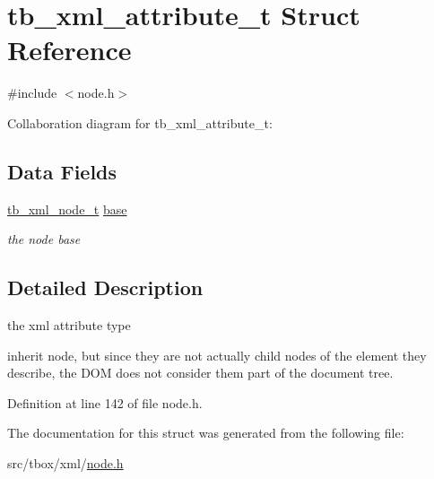 \hypertarget{structtb__xml__attribute__t}{\section{tb\-\_\-xml\-\_\-attribute\-\_\-t Struct Reference}
\label{structtb__xml__attribute__t}
}


{\ttfamily \#include $<$node.\-h$>$}



Collaboration diagram for tb\-\_\-xml\-\_\-attribute\-\_\-t\-:
\subsection*{Data Fields}
\begin{DoxyCompactItemize}
\item 
\hypertarget{structtb__xml__attribute__t_a549d67a3896682da495bfbb67fa7ad9f}{\hyperlink{structtb__xml__node__t}{tb\-\_\-xml\-\_\-node\-\_\-t} \hyperlink{structtb__xml__attribute__t_a549d67a3896682da495bfbb67fa7ad9f}{base}}\label{structtb__xml__attribute__t_a549d67a3896682da495bfbb67fa7ad9f}

\begin{DoxyCompactList}\small\item\em the node base \end{DoxyCompactList}\end{DoxyCompactItemize}


\subsection{Detailed Description}
the xml attribute type


\begin{DoxyPre}
inherit node, 
but since they are not actually child nodes of the element they describe, 
the DOM does not consider them part of the document tree.
\end{DoxyPre}
 

Definition at line 142 of file node.\-h.



The documentation for this struct was generated from the following file\-:\begin{DoxyCompactItemize}
\item 
src/tbox/xml/\hyperlink{node_8h}{node.\-h}\end{DoxyCompactItemize}
